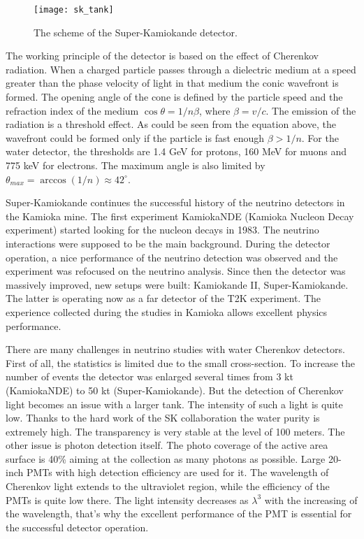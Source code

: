 \documentclass[../main.tex]{subfiles}
\begin{document}
\begin{figure}[!ht]
  \centering
  \texttt{[image: sk\_tank]}
  \caption{The scheme of the Super-Kamiokande detector.}
  \label{fig:t2k:sk}
\end{figure}

The working principle of the detector is based on the effect of Cherenkov radiation. When a charged particle passes through a dielectric medium at a speed greater than the phase velocity of light in that medium the conic wavefront is formed. The opening angle of the cone is defined by the particle speed and the refraction index of the medium $\cos{\theta}=1/n\beta$, where $\beta=v/c$. The emission of the radiation is a threshold effect. As could be seen from the equation above, the wavefront could be formed only if the particle is fast enough $\beta>1/n$. For the water detector, the thresholds are 1.4 GeV for protons, 160 MeV for muons and 775 keV for electrons. The maximum angle is also limited by $\theta_{max}=\arccos(1/n)\approx42^\circ$.

Super-Kamiokande continues the successful history of the neutrino detectors in the Kamioka mine. The first experiment KamiokaNDE (Kamioka Nucleon Decay experiment) started looking for the nucleon decays in 1983. The neutrino interactions were supposed to be the main background. During the detector operation, a nice performance of the neutrino detection was observed and the experiment was refocused on the neutrino analysis. Since then the detector was massively improved, new setups were built: Kamiokande II, Super-Kamiokande. The latter is operating now as a far detector of the T2K experiment. The experience collected during the studies in Kamioka allows excellent physics performance.

There are many challenges in neutrino studies with water Cherenkov detectors. First of all, the statistics is limited due to the small cross-section. To increase the number of events the detector was enlarged several times from 3 kt (KamiokaNDE) to 50 kt (Super-Kamiokande). But the detection of Cherenkov light becomes an issue with a larger tank. The intensity of such a light is quite low. Thanks to the hard work of the SK collaboration the water purity is extremely high. The transparency is very stable at the level of 100 meters. The other issue is photon detection itself. The photo coverage of the active area surface is 40\% aiming at the collection as many photons as possible. Large 20-inch PMTs with high detection efficiency are used for it. The wavelength of Cherenkov light extends to the ultraviolet region, while the efficiency of the PMTs is quite low there. The light intensity decreases as $\lambda^3$ with the increasing of the wavelength, that's why the excellent performance of the PMT is essential for the successful detector operation.
\end{document}
